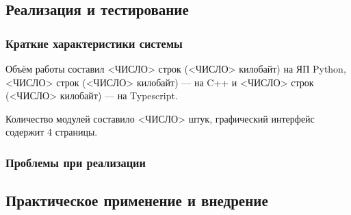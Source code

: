 \documentclass[../document.tex]{subfiles}
\begin{document}
	\subsection{Реализация и тестирование}
	\subsubsection{Краткие характеристики системы}
	\par Объём работы составил <ЧИСЛО> строк (<ЧИСЛО> килобайт) на ЯП Python, <ЧИСЛО> строк (<ЧИСЛО> килобайт) --- на C++ и <ЧИСЛО> строк (<ЧИСЛО> килобайт) --- на Typescript.
	\par Количество модулей составило <ЧИСЛО> штук, графический интерфейс содержит 4 страницы.
	\subsubsection{Проблемы при реализации}
	\subsection{Практическое применение и внедрение}
\end{document}

